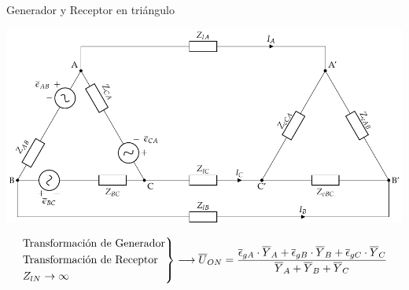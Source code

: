 \documentclass[aspectratio=169, usenames,svgnames,dvipsnames]{beamer}
\begin{document}
\begin{frame}[label={sec:orgcc2c18a}]{Generador y Receptor en triángulo}
\begin{center}
\includegraphics[height=0.7\textheight]{../figs/CircuitoTrifasicaGeneralizado_GTRT.pdf}
\end{center}
\[
  \begin{rcases}
    \text{Transformación de Generador}\\
    \text{Transformación de Receptor}\\
    Z_{lN} \to \infty
  \end{rcases}
  \longrightarrow \overline{U}_{ON} = \frac{\overline{\epsilon}_{gA} \cdot \overline{Y}_A + \overline{\epsilon}_{gB} \cdot \overline{Y}_B + \overline{\epsilon}_{gC} \cdot \overline{Y}_C}{\overline{Y}_A + \overline{Y}_B + \overline{Y}_C}
\]
\end{frame}
\end{document}
